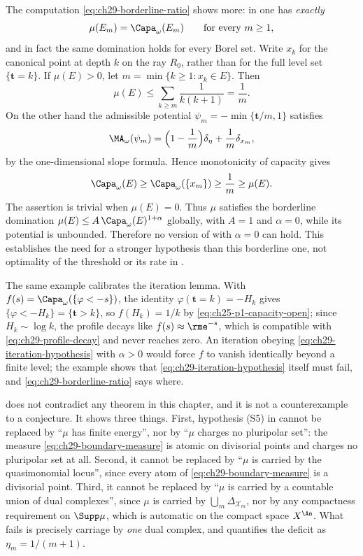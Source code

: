 \begin{example}[The exponent $\alpha=0$ is not allowed]
\label{ex:ch29-borderline}
The computation \eqref{eq:ch29-borderline-ratio} shows more: in
 one has \emph{exactly}
\[
 \mu(E_m)=\Capa_\omega(E_m)\qquad\text{for every }m\geq1 ,
\]
and in fact the same domination holds for every Borel set.  Write $x_k$ for the canonical point at depth $k$ on the ray
$R_0$, rather than for the full level set $\{\mathbf t=k\}$.  If $\mu(E)>0$, let
$m=\min\{k\geq1:x_k\in E\}$.  Then
\[
 \mu(E)\leq\sum_{k\geq m}\frac1{k(k+1)}=\frac1m.
\]
On the other hand the admissible potential
$\psi_m=-\min\{\mathbf t/m,1\}$ satisfies
\[
 \MA_\omega(\psi_m)
  =\Bigl(1-\frac1m\Bigr)\delta_\eta+\frac1m\delta_{x_m},
\]
by the one-dimensional slope formula.  Hence monotonicity of capacity gives
\[
 \Capa_\omega(E)\geq\Capa_\omega(\{x_m\})\geq\frac1m\geq\mu(E).
\]
The assertion is trivial when $\mu(E)=0$.  Thus $\mu$ satisfies the
borderline domination
$\mu(E)\leq A\,\Capa_\omega(E)^{1+\alpha}$ globally, with $A=1$ and
$\alpha=0$, while its potential is unbounded.
Therefore no version of  with
$\alpha=0$ can hold.  This establishes the need for a stronger
hypothesis than this borderline one, not optimality of the threshold
or its rate in .

The same example calibrates the iteration lemma.  With
$f(s)=\Capa_\omega(\{\varphi<-s\})$, the identity
$\varphi(\mathbf t=k)=-H_k$ gives
$\{\varphi<-H_k\}=\{\mathbf t>k\}$, so
$f(H_k)=1/k$ by \eqref{eq:ch25-p1-capacity-open}; since
$H_k\sim\log k$, the profile decays like
$f(s)\approx\rme^{-s}$, which is compatible with
\eqref{eq:ch29-profile-decay} and never reaches zero.  An iteration obeying
\eqref{eq:ch29-iteration-hypothesis} with $\alpha>0$ would force
$f$ to vanish identically beyond a finite level; the example shows that
\eqref{eq:ch29-iteration-hypothesis} itself must fail, and
\eqref{eq:ch29-borderline-ratio} says where.
\end{example}

\begin{remark}
\label{rem:ch29-boundary-scope}
 does not contradict any theorem in
this chapter, and it is not a counterexample to a conjecture.  It shows
three things.  First, hypothesis \textup{(S5)} in
 cannot be replaced by ``$\mu$ has
finite energy'', nor by ``$\mu$ charges no pluripolar set'': the measure
\eqref{eq:ch29-boundary-measure} is atomic on divisorial points and charges
no pluripolar set at all.  Second, it cannot be replaced by ``$\mu$ is
carried by the quasimonomial locus'', since every atom of
\eqref{eq:ch29-boundary-measure} is a divisorial point.  Third, it cannot be
replaced by ``$\mu$ is carried by a countable union of dual complexes'',
since $\mu$ is carried by $\bigcup_m\Delta_{\mathcal X_m}$, nor by any
compactness requirement on $\Supp\mu$, which is automatic on the compact
space $X^{\An}$.  What fails is precisely carriage by \emph{one} dual
complex, and  quantifies the deficit as
$\eta_m=1/(m+1)$.
\end{remark}

